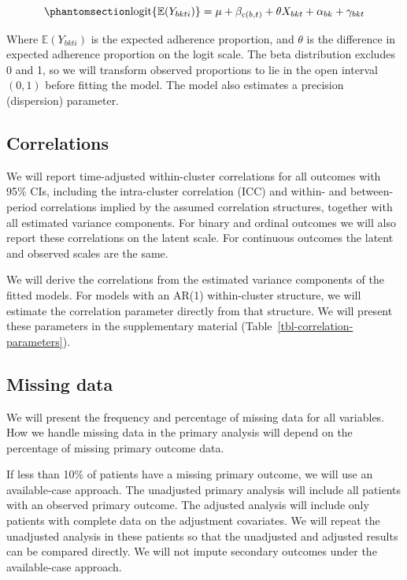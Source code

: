\documentclass[
]{scrartcl}
\begin{document}
\begin{equation}\phantomsection\label{eq-beta-model}{
\text{logit}\{\mathbb{E}(Y_{bkti})\}
= \mu + \beta_{c(b,t)} + \theta X_{bkt} + \alpha_{bk} + \gamma_{bkt}
}\end{equation}

Where \(\mathbb{E}(Y_{bkti})\) is the expected adherence proportion, and
\(\theta\) is the difference in expected adherence proportion on the
logit scale. The beta distribution excludes 0 and 1, so we will
transform observed proportions to lie in the open interval \((0,1)\)
before fitting the model. The model also estimates a precision
(dispersion) parameter.

\subsection{Correlations}\label{sec-correlations}

We will report time-adjusted within-cluster correlations for all
outcomes with 95\% CIs, including the intra-cluster correlation (ICC)
and within- and between-period correlations implied by the assumed
correlation structures, together with all estimated variance components.
For binary and ordinal outcomes we will also report these correlations
on the latent scale. For continuous outcomes the latent and observed
scales are the same.

We will derive the correlations from the estimated variance components
of the fitted models. For models with an AR(1) within-cluster structure,
we will estimate the correlation parameter directly from that structure.
We will present these parameters in the supplementary material
(Table~\ref{tbl-correlation-parameters}).

\subsection{Missing data}\label{sec-missing-data}

We will present the frequency and percentage of missing data for all
variables. How we handle missing data in the primary analysis will
depend on the percentage of missing primary outcome data.

If less than 10\% of patients have a missing primary outcome, we will
use an available-case approach. The unadjusted primary analysis will
include all patients with an observed primary outcome. The adjusted
analysis will include only patients with complete data on the adjustment
covariates. We will repeat the unadjusted analysis in these patients so
that the unadjusted and adjusted results can be compared directly. We
will not impute secondary outcomes under the available-case approach.
\end{document}
